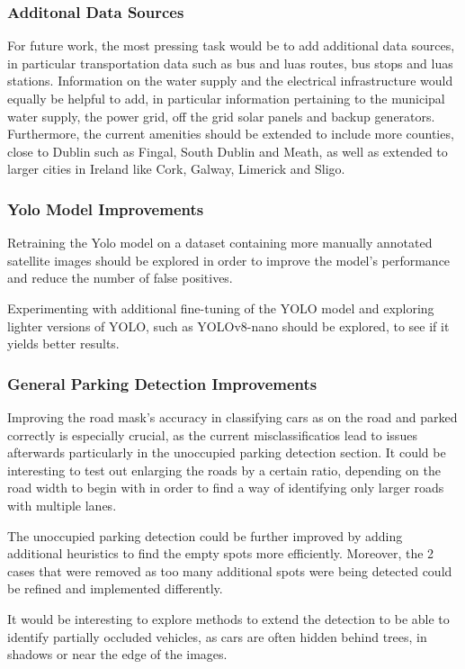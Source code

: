 \subsubsection{Additonal Data Sources}
For future work, the most pressing task would be to add additional data sources,
in particular transportation data such as bus and luas routes, bus stops and
luas stations. Information on the water supply and the electrical infrastructure
would equally be helpful to add, in particular information pertaining to the
municipal water supply, the power grid, off the grid solar panels and backup
generators. Furthermore, the current amenities should be extended to include
more counties, close to Dublin such as Fingal, South Dublin and Meath, as well
as extended to larger cities in Ireland like Cork, Galway, Limerick and Sligo.


\subsubsection{Yolo Model Improvements}
Retraining the Yolo model on a dataset containing more manually annotated
satellite images should be explored in order to improve the model's performance
and reduce the number of false positives.

Experimenting with additional fine-tuning of the YOLO model and exploring lighter 
versions of YOLO, such as YOLOv8-nano should be explored, to see if it yields better results.

\subsubsection{General Parking Detection Improvements}

Improving the road mask's accuracy in classifying cars as on the road and parked
correctly is especially crucial, as the current misclassificatios lead to
issues afterwards particularly in the unoccupied parking detection section. It could
be interesting to test out enlarging the roads by a certain ratio, depending on
the road width to begin with in order to find a way of identifying only larger
roads with multiple lanes.

The unoccupied parking detection could be further improved by adding additional
heuristics to find the empty spots more efficiently. Moreover, the 2 cases that
were removed as too many additional spots were being detected could be refined
and implemented differently.

\newpage{}

It would be interesting to explore methods to extend the detection to be able to
identify partially occluded vehicles, as cars are often hidden behind trees, in
shadows or near the edge of the images.
